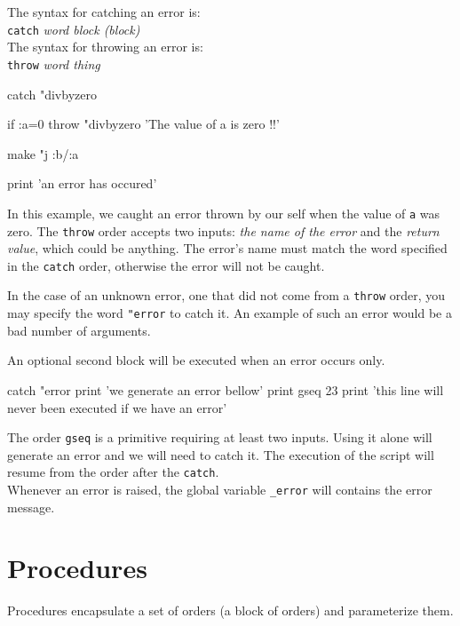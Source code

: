 The syntax for catching an error is:\\
 
{\tt catch} {\it word block (block)} \\
 
The syntax for throwing an error is: \\
 
{\tt throw} {\it word thing} \\
  
\begin{verbatimtab} 
catch "divbyzero { 
 
	if :a=0 { 
		throw "divbyzero 'The value of a is zero !!' 
	} 
 
	make "j :b/:a  
} {
	print 'an error has occured'	
}
\end{verbatimtab}
 
In this example, we caught an error thrown by our self when the value of {\tt a} was zero. The {\tt throw} order accepts two inputs: {\em the name of the error} and the {\em return value}, which could be anything. The error's name must match the word specified in the {\tt catch} order, otherwise the error will not be caught. 
 
In the case of an unknown error, one that did not come from a {\tt throw} order, you may specify the word {\tt "error} to catch it.  An example of such an error would be a bad number of arguments. 

An optional second block will be executed when an error occurs only.
 
\begin{verbatimtab} 
catch "error { 
	print 'we generate an error bellow' 
	print gseq 23 
	print 'this line will never been executed if we have an error' 
} 
\end{verbatimtab} 
 
The order {\tt gseq} is a primitive requiring at least two inputs. Using it alone will generate an error and we will need to catch it. The execution of the script will resume from the order after the {\tt catch}.\\

Whenever an error is raised, the global variable {\tt \_error} will contains the error message.
 
\section{Procedures} 
 
Procedures encapsulate a set of orders (a block of orders) and parameterize them.\\

